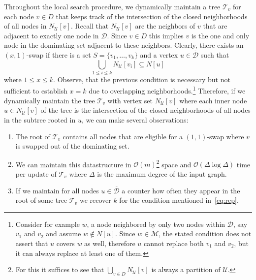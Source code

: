\documentclass[a4paper, USenglish, cleveref, autoref, thm-restate, noalgorithm2e]{socg-lipics-v2021}
\def\Oh#1{\ensuremath{\mathcal O\!\left(#1\right)}}
\newcommand{\domset}{\ensuremath{\mathcal D}\xspace}
\newcommand{\uniquelycovered}{\ensuremath{\mathcal U}\xspace}
\newcommand{\multicovered}{\ensuremath{\mathcal M}\xspace}
\newcommand{\intersectiontree}{\ensuremath{\mathcal T}\xspace}
\newcommand{\cdomset}{\ensuremath{\overline{\mathcal D}}\xspace}
\begin{document}
Throughout the local search procedure, we dynamically maintain a tree $\intersectiontree_v$ for each node $v \in D$ that keeps track of the intersection of the closed neighborhoods of all nodes in $N_{\uniquelycovered}[v]$.
%
Recall that $N_{\uniquelycovered}[v]$ are the neighbors of $v$ that are adjacent to exactly one node in $\domset$.
%
Since $v \in D$ this implies $v$ is the one and only node in the dominating set adjacent to these neighbors.
%
Clearly, there exists an $(x,1)$-swap if there is a set $S = \{v_1,\ldots,v_k\}$ and a vertex $u \in \cdomset$ such that
\begin{equation}\label{eq:rep}
    \bigcup_{1\leq i \leq k}N_{\uniquelycovered}[v_i] \subseteq N[u]
\end{equation}
where $1 \leq x\leq k$.
%
Observe, that the previous condition is necessary but not sufficient to establish $x=k$ due to overlapping neighborhoods.\footnote{Consider for example $w$, a node neighbored by only two nodes within $\domset$, say $v_1$ and $v_2$ and assume $w\notin N[u]$. Since $w\in\multicovered$, the stated condition does not assert that $u$ covers $w$ as well, therefore $u$ cannot replace both $v_1$ and $v_2$, but it can always replace at least one of them.}
%
Therefore, if we dynamically maintain the tree $\intersectiontree_v$ with vertex set $N_{\uniquelycovered}[v]$ where each inner node $u \in N_{\uniquelycovered}[v]$ of the tree is the intersection of the closed neighborhoods of all nodes in the subtree rooted in $u$, we can make several observations:
\begin{enumerate}
    \item The root of $\intersectiontree_v$ contains all nodes that are eligible for a $(1,1)$-swap where $v$ is swapped out of the dominating set.
    \item We can maintain this datastructure in $\Oh m$\footnote{For this it suffices to see that $\bigcup_{v\in D} N_{\uniquelycovered}[v]$ is always a partition of $\uniquelycovered$.} space and $\Oh{\Delta\log\Delta}$ time per update of $\intersectiontree_v$ where $\Delta$ is the maximum degree of the input graph.
    \item If we maintain for all nodes $u \in \cdomset$ a counter how often they appear in the root of some tree $\intersectiontree_v$ we recover $k$ for the condition mentioned in~\cref{eq:rep}.
\end{enumerate}
\end{document}
